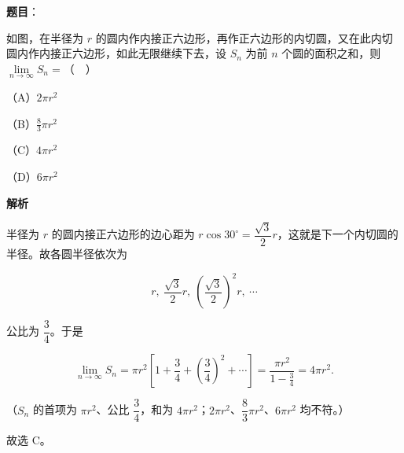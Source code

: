 \begin{answer}

\textbf{题目}：

如图，在半径为 $r$ 的圆内作内接正六边形，再作正六边形的内切圆，又在此内切圆内作内接正六边形，如此无限继续下去，设 $S_n$ 为前 $n$ 个圆的面积之和，则 $\lim\limits_{n\to\infty}S_n=$（　）

（A）$2\pi r^2$

（B）$\frac83\pi r^2$

（C）$4\pi r^2$

（D）$6\pi r^2$
\nopagebreak[4]
\begin{center}\end{center}
\nopagebreak[4]
\textbf{解析}

半径为 $r$ 的圆内接正六边形的边心距为 $r\cos30^\circ=\dfrac{\sqrt3}{2}r$，这就是下一个内切圆的半径。故各圆半径依次为

\nopagebreak[4]
\[r,\ \frac{\sqrt3}{2}r,\ \left(\frac{\sqrt3}{2}\right)^2r,\ \cdots\]

公比为 $\dfrac34$。于是

\nopagebreak[4]
\[\lim_{n\to\infty}S_n=\pi r^2\left[1+\frac34+\left(\frac34\right)^2+\cdots\right]
=\frac{\pi r^2}{1-\frac34}=4\pi r^2.\]

（$S_n$ 的首项为 $\pi r^2$、公比 $\dfrac34$，和为 $4\pi r^2$；$2\pi r^2$、$\dfrac83\pi r^2$、$6\pi r^2$ 均不符。）

故选 C。


\end{answer}
